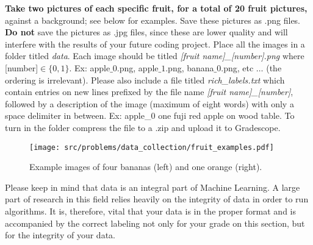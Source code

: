 
{\bf Take two pictures of each specific fruit, for a total of 20 fruit pictures,} against a background; see below for examples. Save these pictures as .png files. {\bf Do not} save the pictures as .jpg files, since these are lower quality and will interfere with the results of your future coding project. Place all the images in a folder titled \emph{data}. Each image should be titled \emph{[fruit name]\_[number].png} where [number]$\in \{0, 1\}$. Ex: apple$\_0$.png, apple$\_1$.png, banana$\_0$.png, etc $\ldots$ (the ordering is irrelevant). Please also include a file titled \emph{rich\_labels.txt} which contain entries on new lines prefixed by the file name \emph{[fruit name]\_[number]}, followed by a description of the image (maximum of eight words) with only a space delimiter in between. Ex: apple\_0 one fuji red apple on wood table. To turn in the folder compress the file to a .zip and upload it to Gradescope.

\begin{figure}[h!]
    \begin{center}
    \texttt{[image: src/problems/data\_collection/fruit\_examples.pdf]}
    \caption{Example images of four bananas (left) and one orange (right).} \label{fig:robot}
    \end{center}
\end{figure}

Please keep in mind that data is an integral part of Machine Learning. A large part of research in this field relies heavily on the integrity of data in order to run algorithms. It is, therefore, vital that your data is in the proper format and is accompanied by the correct labeling not only for your grade on this section, but for the integrity of your data.

